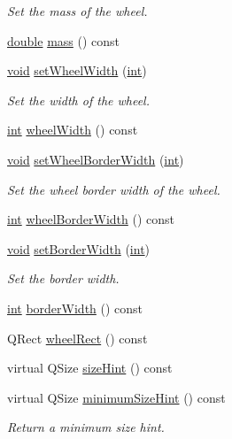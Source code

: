\begin{DoxyCompactItemize}
\begin{DoxyCompactList}\small\item\em Set the mass of the wheel. \end{DoxyCompactList}\item 
\hyperlink{_super_l_u_support_8h_a8956b2b9f49bf918deed98379d159ca7}{double} \hyperlink{class_qwt_wheel_a55de1496f0eef04da9bc293306a40df6}{mass} () const 
\item 
\hyperlink{group___u_a_v_objects_plugin_ga444cf2ff3f0ecbe028adce838d373f5c}{void} \hyperlink{class_qwt_wheel_ac434254039981344ccca22c76bce4f38}{set\-Wheel\-Width} (\hyperlink{ioapi_8h_a787fa3cf048117ba7123753c1e74fcd6}{int})
\begin{DoxyCompactList}\small\item\em Set the width of the wheel. \end{DoxyCompactList}\item 
\hyperlink{ioapi_8h_a787fa3cf048117ba7123753c1e74fcd6}{int} \hyperlink{class_qwt_wheel_ad88a4923037b4c692a5f001fb55a9549}{wheel\-Width} () const 
\item 
\hyperlink{group___u_a_v_objects_plugin_ga444cf2ff3f0ecbe028adce838d373f5c}{void} \hyperlink{class_qwt_wheel_a4aa70134746908cef687e3c1bb7aa60c}{set\-Wheel\-Border\-Width} (\hyperlink{ioapi_8h_a787fa3cf048117ba7123753c1e74fcd6}{int})
\begin{DoxyCompactList}\small\item\em Set the wheel border width of the wheel. \end{DoxyCompactList}\item 
\hyperlink{ioapi_8h_a787fa3cf048117ba7123753c1e74fcd6}{int} \hyperlink{class_qwt_wheel_a76117515ddfb6c0bbd680e070dd67670}{wheel\-Border\-Width} () const 
\item 
\hyperlink{group___u_a_v_objects_plugin_ga444cf2ff3f0ecbe028adce838d373f5c}{void} \hyperlink{class_qwt_wheel_a50a2046f1151af7599aee3ad8f4e3ff0}{set\-Border\-Width} (\hyperlink{ioapi_8h_a787fa3cf048117ba7123753c1e74fcd6}{int})
\begin{DoxyCompactList}\small\item\em Set the border width. \end{DoxyCompactList}\item 
\hyperlink{ioapi_8h_a787fa3cf048117ba7123753c1e74fcd6}{int} \hyperlink{class_qwt_wheel_a2bb051e6a069283c574b7ea278bbb96f}{border\-Width} () const 
\item 
Q\-Rect \hyperlink{class_qwt_wheel_a72891a083911e03110e1f1f60f47f064}{wheel\-Rect} () const 
\item 
virtual Q\-Size \hyperlink{class_qwt_wheel_a77404d4e604a196bd4e809ec7d9f2076}{size\-Hint} () const 
\item 
virtual Q\-Size \hyperlink{class_qwt_wheel_a668397451f5ad7b2a78d01d9e7141bcf}{minimum\-Size\-Hint} () const 
\begin{DoxyCompactList}\small\item\em Return a minimum size hint. \end{DoxyCompactList}\end{DoxyCompactItemize}
